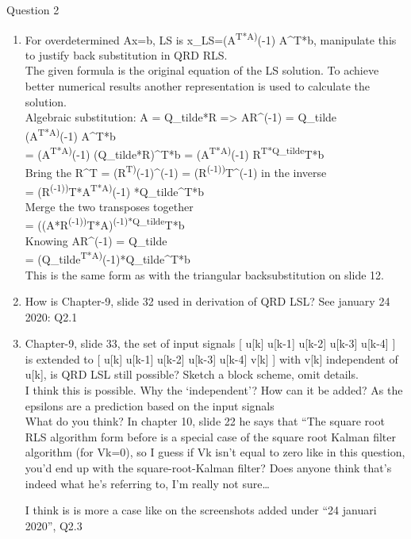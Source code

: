 \documentclass[
  a4paper,
  ,captions=tableheading
]{scrartcl}
\begin{document}
Question 2

\begin{enumerate}
\def\labelenumi{\arabic{enumi}.}
\item
  For overdetermined Ax=b, LS is x\_LS=(A\textsuperscript{T*A)}(-1)
  A\^{}T*b, manipulate this to justify back substitution in QRD RLS.\\
  The given formula is the original equation of the LS solution. To
  achieve better numerical results another representation is used to
  calculate the solution.\\
  Algebraic substitution: A = Q\_tilde*R =\textgreater{} AR\^{}(-1) =
  Q\_tilde\\
  (A\textsuperscript{T*A)}(-1) A\^{}T*b\\
  = (A\textsuperscript{T*A)}(-1) (Q\_tilde*R)\^{}T*b =
  (A\textsuperscript{T*A)}(-1) R\textsuperscript{T*Q\_tilde}T*b\\
  Bring the R\^{}T = (R\textsuperscript{T)}(-1)\^{}(-1) =
  (R\textsuperscript{(-1))}T\^{}(-1) in the inverse\\
  = (R\textsuperscript{(-1))}T*A\textsuperscript{T*A)}(-1)
  *Q\_tilde\^{}T*b\\
  Merge the two transposes together\\
  = ((A*R\textsuperscript{(-1))}T*A)\textsuperscript{(-1)*Q\_tilde}T*b\\
  Knowing AR\^{}(-1) = Q\_tilde\\
  = (Q\_tilde\textsuperscript{T*A)}(-1)*Q\_tilde\^{}T*b\\
  This is the same form as with the triangular backsubstitution on slide
  12.\\
\item
  How is Chapter-9, slide 32 used in derivation of QRD LSL? See january
  24 2020: Q2.1\\
\item
  Chapter-9, slide 33, the set of input signals {[} u{[}k{]} u{[}k-1{]}
  u{[}k-2{]} u{[}k-3{]} u{[}k-4{]} {]}\\
  is extended to {[} u{[}k{]} u{[}k-1{]} u{[}k-2{]} u{[}k-3{]}
  u{[}k-4{]} v{[}k{]} {]} with v{[}k{]} independent of u{[}k{]}, is QRD
  LSL still possible? Sketch a block scheme, omit details.\\
  I think this is possible. Why the `independent'? How can it be added?
  As the epsilons are a prediction based on the input signals\\
  What do you think? In chapter 10, slide 22 he says that ``The square
  root RLS algorithm form before is a special case of the square root
  Kalman filter algorithm (for Vk=0), so I guess if Vk isn't equal to
  zero like in this question, you'd end up with the square-root-Kalman
  filter? Does anyone think that's indeed what he's referring to, I'm
  really not sure\ldots{}

  I think is is more a case like on the screenshots added under ``24
  januari 2020'', Q2.3
\end{enumerate}
\end{document}
